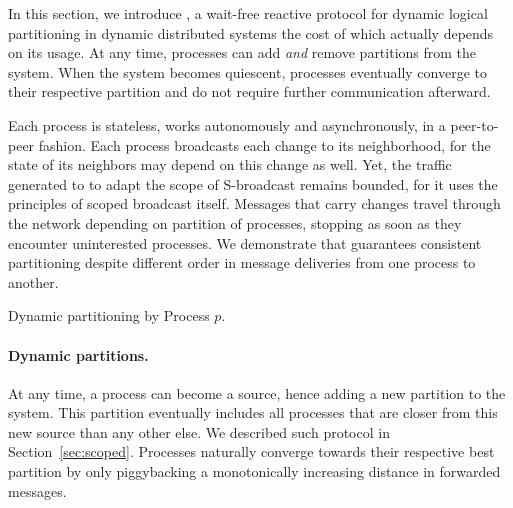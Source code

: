 In this section, we introduce \NAME, a wait-free reactive protocol for
dynamic logical partitioning in dynamic distributed systems the cost
of which actually depends on its usage. At any time, processes can add
\emph{and} remove partitions from the system. When the system becomes
quiescent, processes eventually converge to their respective partition
and do not require further communication afterward.

Each process is stateless, works autonomously and asynchronously, in a
peer-to-peer fashion. Each process broadcasts each change to its
neighborhood, for the state of its neighbors may depend on this change
as well. Yet, the traffic generated to to adapt the scope of
S-broadcast remains bounded, for it uses the principles of scoped
broadcast itself. Messages that carry changes travel through the
network depending on partition of processes, stopping as soon as they
encounter uninterested processes. We demonstrate that \NAME guarantees
consistent partitioning despite different order in message deliveries
from one process to another.





\begin{algorithm}
  
  \caption{\label{algo:adddelundo}Dynamic partitioning by Process $p$.}
\end{algorithm}




\paragraph{Dynamic partitions.}
At any time, a process can become a source, hence adding a new
partition to the system. This partition eventually includes all
processes that are closer from this new source than any other else. We
described such protocol in Section~\ref{sec:scoped}. Processes
naturally converge towards their respective best partition by only
piggybacking a monotonically increasing distance in forwarded
messages. %

